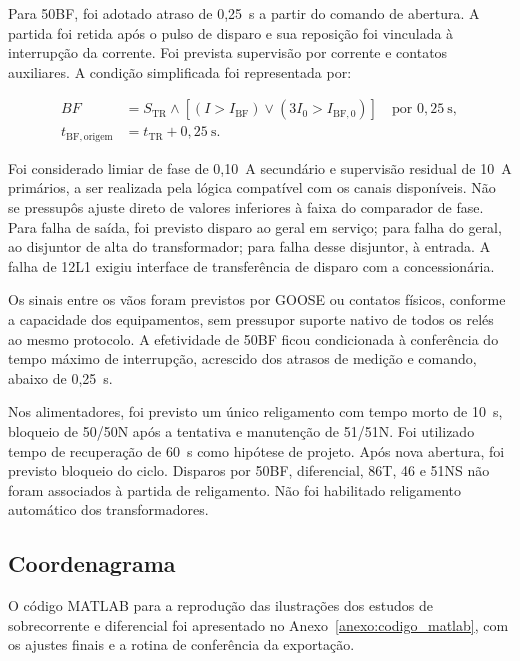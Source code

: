 Para 50BF, foi adotado atraso de 0,25~s a partir do comando de abertura. A partida foi retida após o pulso de disparo e sua reposição foi vinculada à interrupção da corrente. Foi prevista supervisão por corrente e contatos auxiliares. A condição simplificada foi representada por:

\begin{equation}
    \begin{aligned}
        BF&=S_{\mathrm{TR}}\land
        \left[(I>I_{\mathrm{BF}})\lor(3I_0>I_{\mathrm{BF},0})\right]
        \quad\text{por }0{,}25~\mathrm{s},\\
        t_{\mathrm{BF,origem}}&=t_{\mathrm{TR}}+0{,}25~\mathrm{s}.
    \end{aligned}
    \label{eq:oc_bf}
\end{equation}

Foi considerado limiar de fase de 0,10~A secundário e supervisão residual de 10~A primários, a ser realizada pela lógica compatível com os canais disponíveis. Não se pressupôs ajuste direto de valores inferiores à faixa do comparador de fase. Para falha de saída, foi previsto disparo ao geral em serviço; para falha do geral, ao disjuntor de alta do transformador; para falha desse disjuntor, à entrada. A falha de 12L1 exigiu interface de transferência de disparo com a concessionária.

Os sinais entre os vãos foram previstos por GOOSE ou contatos físicos, conforme a capacidade dos equipamentos, sem pressupor suporte nativo de todos os relés ao mesmo protocolo. A efetividade de 50BF ficou condicionada à conferência do tempo máximo de interrupção, acrescido dos atrasos de medição e comando, abaixo de 0,25~s.

Nos alimentadores, foi previsto um único religamento com tempo morto de 10~s, bloqueio de 50/50N após a tentativa e manutenção de 51/51N. Foi utilizado tempo de recuperação de 60~s como hipótese de projeto. Após nova abertura, foi previsto bloqueio do ciclo. Disparos por 50BF, diferencial, 86T, 46 e 51NS não foram associados à partida de religamento. Não foi habilitado religamento automático dos transformadores.

\subsection{Coordenagrama}

O código MATLAB para a reprodução das ilustrações dos estudos de sobrecorrente e diferencial foi apresentado no Anexo~\ref{anexo:codigo_matlab}, com os ajustes finais e a rotina de conferência da exportação.

